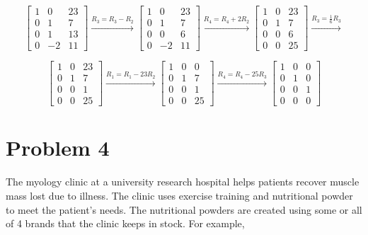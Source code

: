 \documentclass[letter,11pt]{article}
\begin{document}
\begin{tcolorbox}[boxrule=1mm, width=(.9\linewidth),before=\hfill,after=\hfill,adjusted title={Problem \# 3 Solutions}]
$$\begin{bmatrix}
1 & 0 & 23 \\
0 & 1 & 7\\
0 & 1 & 13\\
0 & -2 & 11
\end{bmatrix} \xrightarrow{R_3=R_3-R_2}
\begin{bmatrix}
1 & 0 & 23 \\
0 & 1 & 7\\
0 & 0 & 6\\
0 & -2 & 11
\end{bmatrix}\xrightarrow{R_4=R_4+2R_2}
\begin{bmatrix}
1 & 0 & 23 \\
0 & 1 & 7\\
0 & 0 & 6\\
0 & 0 & 25
\end{bmatrix}\xrightarrow{R_3 = \frac{1}{6}R_3}$$

$$\begin{bmatrix}
1 & 0 & 23 \\
0 & 1 & 7\\
0 & 0 & 1\\
0 & 0 & 25
\end{bmatrix} \xrightarrow{R_1=R_1-23R_2}
\begin{bmatrix}
1 & 0 & 0 \\
0 & 1 & 7\\
0 & 0 & 1\\
0 & 0 & 25
\end{bmatrix}\xrightarrow{R_4=R_4-25R_3}
\begin{bmatrix}
1 & 0 & 0 \\
0 & 1 & 0\\
0 & 0 & 1\\
0 & 0 & 0
\end{bmatrix}$$

\end{tcolorbox}
\newpage
\section{Problem 4}
The myology clinic at a university research hospital helps patients recover muscle mass lost due to illness. The clinic uses exercise training and nutritional powder to meet the patient's needs. The nutritional powders are created using some or all of 4 brands that the clinic keeps in stock. For example,
\end{document}
